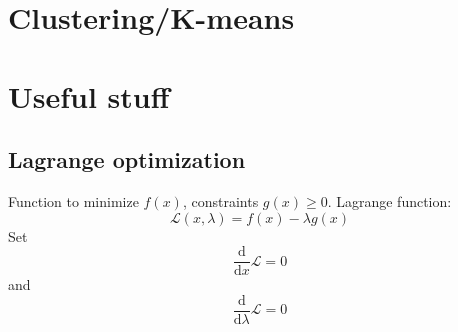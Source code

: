 \documentclass[a4paper]{scrartcl}
\begin{document}
\section{Clustering/K-means}
\label{sec:clustering_k_means}


\section{Useful stuff}

\subsection{Lagrange optimization}
Function to minimize $f(x)$, constraints $g(x)\ge 0$. Lagrange function:
\[\mathcal{L}(x,\lambda)=f(x)-\lambda g(x)\]
Set
\[\frac{\mathrm{d}}{\mathrm{d}x}\mathcal{L}=0\] and
\[\frac{\mathrm{d}}{\mathrm{d}\lambda}\mathcal{L}=0\]

\end{document}
